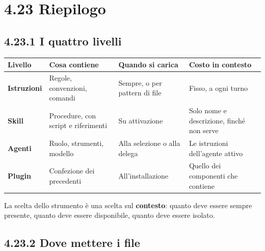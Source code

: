\documentclass[
  italian,
  10pt,
]{book}
\newcounter{none} %
\begin{document}
\section{4.23 Riepilogo}\label{riepilogo-3}

\subsection{4.23.1 I quattro livelli}\label{i-quattro-livelli}

{\def\LTcaptype{none} %
\begin{longtable}[]{@{}
  >{\raggedright\arraybackslash}p{}
  >{\raggedright\arraybackslash}p{}
  >{\raggedright\arraybackslash}p{}
  >{\raggedright\arraybackslash}p{}@{}}
\toprule\noalign{}
\begin{minipage}[b]{\linewidth}\raggedright
Livello
\end{minipage} & \begin{minipage}[b]{\linewidth}\raggedright
Cosa contiene
\end{minipage} & \begin{minipage}[b]{\linewidth}\raggedright
Quando si carica
\end{minipage} & \begin{minipage}[b]{\linewidth}\raggedright
Costo in contesto
\end{minipage} \\
\midrule\noalign{}
\endhead
\bottomrule\noalign{}
\endlastfoot
\textbf{Istruzioni} & Regole, convenzioni, comandi & Sempre, o per
pattern di file & Fisso, a ogni turno \\
\textbf{Skill} & Procedure, con script e riferimenti & Su attivazione &
Solo nome e descrizione, finché non serve \\
\textbf{Agenti} & Ruolo, strumenti, modello & Alla selezione o alla
delega & Le istruzioni dell'agente attivo \\
\textbf{Plugin} & Confezione dei precedenti & All'installazione & Quello
dei componenti che contiene \\
\end{longtable}
}

La scelta dello strumento è una scelta sul \textbf{contesto}: quanto
deve essere sempre presente, quanto deve essere disponibile, quanto deve
essere isolato.

\subsection{4.23.2 Dove mettere i file}\label{dove-mettere-i-file}
\end{document}
